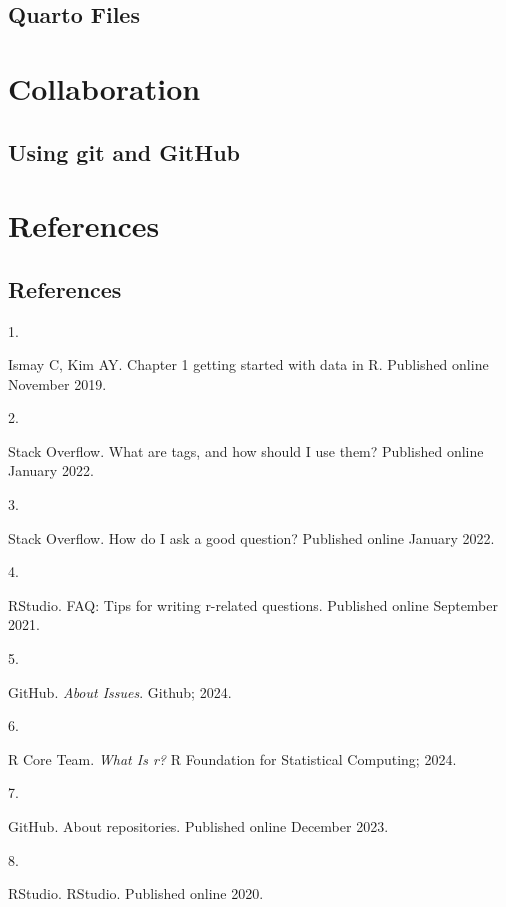 \documentclass[
  letterpaper,
  DIV=11,
  numbers=noendperiod]{scrreprt}
\newlength{\cslhangindent}
\newlength{\csllabelwidth}
\newenvironment{CSLReferences}[2] %
 {\begin{list}{}{%
  \setlength{\itemindent}{0pt}
  \setlength{\leftmargin}{0pt}
  \setlength{\parsep}{0pt}
  \ifodd #1
   \setlength{\leftmargin}{\cslhangindent}
   \setlength{\itemindent}{-1\cslhangindent}
  \fi
  \setlength{\itemsep}{#2\baselineskip}}}
 {\end{list}}
\newcommand{\CSLLeftMargin}[1]{\parbox[t]{\csllabelwidth}{\strut#1\strut}}
\newcommand{\CSLRightInline}[1]{\parbox[t]{\linewidth - \csllabelwidth}{\strut#1\strut}}
\begin{document}
\chapter{Quarto Files}\label{sec-quarto-files}

\part{Collaboration}

\chapter{Using git and GitHub}\label{sec-using-git-and-github}

\part{References}

\chapter*{References}\label{references-1}


\label{refs}
\begin{CSLReferences}{0}{1}
\CSLLeftMargin{1. }%
\CSLRightInline{Ismay C, Kim AY. Chapter 1 getting started with data in
{R}. Published online November 2019.}

\CSLLeftMargin{2. }%
\CSLRightInline{Stack Overflow. What are tags, and how should {I} use
them? Published online January 2022.}

\CSLLeftMargin{3. }%
\CSLRightInline{Stack Overflow. How do {I} ask a good question?
Published online January 2022.}

\CSLLeftMargin{4. }%
\CSLRightInline{RStudio. {FAQ}: Tips for writing r-related questions.
Published online September 2021.}

\CSLLeftMargin{5. }%
\CSLRightInline{GitHub. \emph{About Issues}. Github; 2024.}

\CSLLeftMargin{6. }%
\CSLRightInline{R Core Team. \emph{What Is r?} R Foundation for
Statistical Computing; 2024.}

\CSLLeftMargin{7. }%
\CSLRightInline{GitHub. About repositories. Published online December
2023.}

\CSLLeftMargin{8. }%
\CSLRightInline{RStudio. {RStudio}. Published online 2020.}

\end{CSLReferences}
\end{document}
